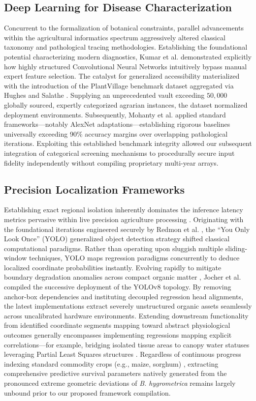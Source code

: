 \documentclass[conference]{IEEEtran}
\begin{document}
\subsection{Deep Learning for Disease Characterization}
Concurrent to the formalization of botanical constraints, parallel advancements within the agricultural informatics spectrum aggressively altered classical taxonomy and pathological tracing methodologies. Establishing the foundational potential characterizing modern diagnostics, Kumar et al. \cite{kumar} demonstrated explicitly how highly structured Convolutional Neural Networks intuitively bypass manual expert feature selection. The catalyst for generalized accessibility materialized with the introduction of the PlantVillage benchmark dataset aggregated via Hughes and Salathe \cite{hughes}. Supplying an unprecedented vault exceeding $50,000$ globally sourced, expertly categorized agrarian instances, the dataset normalized deployment environments. Subsequently, Mohanty et al. \cite{mohanty} applied standard frameworks—notably AlexNet adaptations—establishing rigorous baselines universally exceeding 90\% accuracy margins over overlapping pathological iterations. Exploiting this established benchmark integrity allowed our subsequent integration of categorical screening mechanisms to procedurally secure input fidelity independently without compiling proprietary multi-year arrays.

\subsection{Precision Localization Frameworks}
Establishing exact regional isolation inherently dominates the inference latency metrics pervasive within live precision agriculture processing \cite{kamilaris}. Originating with the foundational iterations engineered securely by Redmon et al. \cite{redmon}, the ``You Only Look Once'' (YOLO) generalized object detection strategy shifted classical computational paradigms. Rather than operating upon sluggish multiple sliding-window techniques, YOLO maps regression paradigms concurrently to deduce localized coordinate probabilities instantly. Evolving rapidly to mitigate boundary degradation anomalies across compact organic matter \cite{shi}, Jocher et al. \cite{yolo8} compiled the successive deployment of the YOLOv8 topology. By removing anchor-box dependencies and instituting decoupled regression head alignments, the latest implementations extract severely unstructured organic assets seamlessly across uncalibrated hardware environments. Extending downstream functionality from identified coordinate segments mapping toward abstract physiological outcomes generally encompasses implementing regressions mapping explicit correlations—for example, bridging isolated tissue areas to canopy water statuses leveraging Partial Least Squares structures \cite{zhang}. Regardless of continuous progress indexing standard commodity crops (e.g., maize, sorghum) \cite{qiao}, extracting comprehensive predictive survival parameters natively generated from the pronounced extreme geometric deviations of \textit{B. hygrometrica} remains largely unbound prior to our proposed framework compilation.
\end{document}
